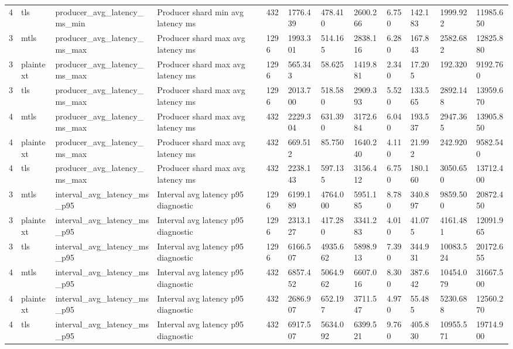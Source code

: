 \begin{longtable}{llllllllllll}
4 & tls & producer\_avg\_latency\_ms\_min & Producer shard min avg latency ms & 432 & 1776.439 & 478.410 & 2600.266 & 6.750 & 142.183 & 1999.922 & 11985.650 \\
3 & mtls & producer\_avg\_latency\_ms\_max & Producer shard max avg latency ms & 1296 & 1993.301 & 514.165 & 2838.116 & 6.280 & 167.843 & 2582.682 & 12825.880 \\
3 & plaintext & producer\_avg\_latency\_ms\_max & Producer shard max avg latency ms & 1296 & 565.343 & 58.625 & 1419.881 & 2.340 & 17.205 & 192.320 & 9192.760 \\
3 & tls & producer\_avg\_latency\_ms\_max & Producer shard max avg latency ms & 1296 & 2013.700 & 518.580 & 2909.393 & 5.520 & 133.565 & 2892.148 & 13959.670 \\
4 & mtls & producer\_avg\_latency\_ms\_max & Producer shard max avg latency ms & 432 & 2229.304 & 631.390 & 3172.684 & 6.040 & 193.537 & 2947.365 & 13905.850 \\
4 & plaintext & producer\_avg\_latency\_ms\_max & Producer shard max avg latency ms & 432 & 669.512 & 85.750 & 1640.240 & 4.110 & 21.992 & 242.920 & 9582.540 \\
4 & tls & producer\_avg\_latency\_ms\_max & Producer shard max avg latency ms & 432 & 2238.143 & 597.135 & 3156.412 & 6.750 & 180.160 & 3050.650 & 13712.400 \\
3 & mtls & interval\_avg\_latency\_ms\_p95 & Interval avg latency p95 diagnostic & 1296 & 6199.189 & 4764.000 & 5951.185 & 8.780 & 340.897 & 9859.500 & 20872.450 \\
3 & plaintext & interval\_avg\_latency\_ms\_p95 & Interval avg latency p95 diagnostic & 1296 & 2313.127 & 417.280 & 3341.283 & 4.010 & 41.075 & 4161.481 & 12091.965 \\
3 & tls & interval\_avg\_latency\_ms\_p95 & Interval avg latency p95 diagnostic & 1296 & 6166.507 & 4935.662 & 5898.913 & 7.390 & 344.931 & 10083.524 & 20172.655 \\
4 & mtls & interval\_avg\_latency\_ms\_p95 & Interval avg latency p95 diagnostic & 432 & 6857.452 & 5064.962 & 6607.016 & 8.300 & 387.642 & 10454.079 & 31667.500 \\
4 & plaintext & interval\_avg\_latency\_ms\_p95 & Interval avg latency p95 diagnostic & 432 & 2686.907 & 652.197 & 3711.547 & 4.970 & 55.485 & 5230.688 & 12560.270 \\
4 & tls & interval\_avg\_latency\_ms\_p95 & Interval avg latency p95 diagnostic & 432 & 6917.507 & 5634.092 & 6399.521 & 9.760 & 405.830 & 10955.571 & 19714.900 \\

\end{longtable}
